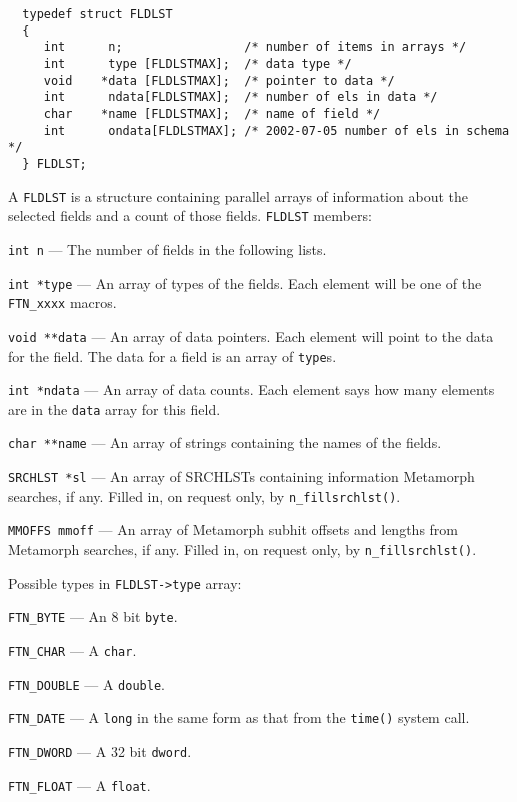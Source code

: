 
\SYNOPSIS
\begin{verbatim}
  typedef struct FLDLST
  {
     int      n;                 /* number of items in arrays */
     int      type [FLDLSTMAX];  /* data type */
     void    *data [FLDLSTMAX];  /* pointer to data */
     int      ndata[FLDLSTMAX];  /* number of els in data */
     char    *name [FLDLSTMAX];  /* name of field */
     int      ondata[FLDLSTMAX]; /* 2002-07-05 number of els in schema */
  } FLDLST;
\end{verbatim}

A \verb`FLDLST` is a structure containing parallel arrays of information
about the selected fields and a count of those fields. \verb`FLDLST` members:

\verb`int n` --- The number of fields in the following lists.

\verb`int *type` --- An array of types of the fields.  Each element will
be one of the \verb`FTN_xxxx` macros.

\verb`void **data` --- An array of data pointers.  Each element will
point to the data for the field. The data for a field is an
array of \verb`type`s.

\verb`int *ndata` ---  An array of data counts. Each element says how
many elements are in the \verb`data` array for this field.

\verb`char **name` --- An array of strings containing the names of the
fields.

\verb`SRCHLST *sl` --- An array of SRCHLSTs containing information
Metamorph searches, if any. Filled in, on request only,
by \verb`n_fillsrchlst()`.

\verb`MMOFFS mmoff` --- An array of Metamorph subhit offsets and lengths
from Metamorph searches, if any. Filled in, on request only,
by \verb`n_fillsrchlst()`.

Possible types in \verb`FLDLST->type` array:

\verb`FTN_BYTE` --- An 8 bit \verb`byte`.

\verb`FTN_CHAR` --- A \verb`char`.

\verb`FTN_DOUBLE` --- A \verb`double`.

\verb`FTN_DATE` --- A \verb`long` in the same form as that from the
\verb`time()` system call.

\verb`FTN_DWORD` --- A 32 bit \verb`dword`.

\verb`FTN_FLOAT` --- A \verb`float`.

